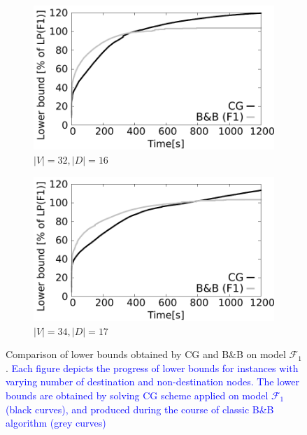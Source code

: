 \begin{figure}[!htb]
    \begin{subfigure}[b]{0.49\textwidth}
        \includegraphics[width=\textwidth]{lower-bound-32-16}
        \caption{$|V|=32, |D|=16$}
        \label{fig:cggr32-16}
    \end{subfigure}
    \hfill %
    \begin{subfigure}[b]{0.49\textwidth}
        \includegraphics[width=\textwidth]{lower-bound-34-17}
        \caption{$|V|=34, |D|=17$}
        \label{fig:cggr34-17}
    \end{subfigure}
  \caption{Comparison of lower bounds obtained by CG and B\&B on model $\mathcal{F}_1$.
	\textcolor{blue}{Each figure depicts the progress of lower bounds for instances with varying number of destination and non-destination nodes.
	The lower bounds are obtained by solving CG scheme applied on model $\mathcal{F}_1$ (black curves), and produced during the course of classic B\&B algorithm (grey curves)
}}
\end{figure}
